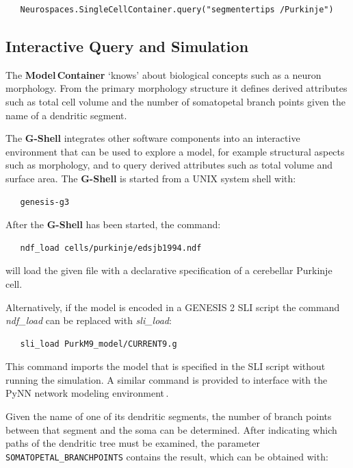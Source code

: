 \documentclass[12pt]{article}
\begin{document}
{\footnotesize
\begin{verbatim}
   Neurospaces.SingleCellContainer.query("segmentertips /Purkinje")
\end{verbatim}
}

\subsection{Interactive Query and Simulation}

The {\bf Model\,Container} `knows' about biological concepts such as a neuron
morphology.  From the primary morphology structure it defines derived
attributes such as total cell volume and the number of somatopetal
branch points given the name of a dendritic segment.

The {\bf G-Shell} integrates other software components into an
interactive environment that can be used to explore a
model, for example structural aspects such as morphology, and to query
derived attributes such as total volume and surface area.  The {\bf
  G-Shell} is started from a UNIX system shell with:

{\footnotesize
\begin{verbatim}
   genesis-g3
\end{verbatim}
}

After the {\bf G-Shell} has been started, the command:

{\footnotesize
\begin{verbatim}
   ndf_load cells/purkinje/edsjb1994.ndf
\end{verbatim}
}

will load the given file with a declarative specification of a
cerebellar Purkinje cell.

Alternatively, if the model is encoded in a GENESIS 2 SLI script the
command {\it ndf\_load} can be replaced with {\it sli\_load}:

{\footnotesize
\begin{verbatim}
   sli_load PurkM9_model/CURRENT9.g
\end{verbatim}
}

This command imports the model that is specified in the SLI script
without running the simulation.  A similar command is provided to
interface with the PyNN network modeling
environment\,\cite{andrew08:_pynn}.

Given the name of one of its dendritic segments, the number of branch
points between that segment and the soma can be determined. After
indicating which paths of the dendritic tree must be examined, the
parameter {\tt SOMATOPETAL\_BRANCHPOINTS} contains the result, which
can be obtained with:
\end{document}
